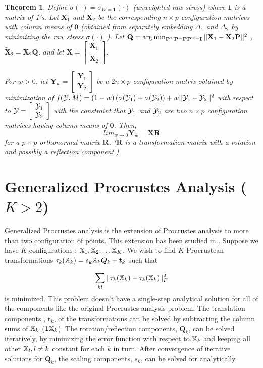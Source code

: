 \documentclass[12pt,oneside,final]{thesis}\usepackage[]{graphicx}\usepackage[]{color}
\newtheorem{thm}{Theorem}
\begin{document}
\begin{thm}
Define $\sigma(\cdot)=\sigma_{W=\bm{1}}(\cdot)$ (unweighted raw stress) where $\bm{1}$ is a matrix of 1's.
 Let $\mathbf{X}_1$ and $\mathbf{X}_2$ be the corresponding $n\times p$ configuration matrices with column means of $\bm{0}$ (obtained from separately embedding  $\Delta_1$ and $\Delta_2$ by minimizing the raw stress $\sigma(\cdot)$ ). 
Let  $\mathbf{Q}=\arg\min_{\mathbf{P^T}\mathbf{P}=\mathbf{P}\mathbf{P^T}=\mathbf{I}}||{\mathbf{X}_1-\mathbf{X}_2}\mathbf{P}||^2$ ,   $\mathbf{\tilde{X}}_2= \mathbf{X}_2\mathbf{Q}$, 
and let  
$\mathbf{X}=\left[\begin{array}{c}
\mathbf{X}_1\\
\mathbf{\tilde{X}}_2
\end{array}\right]$.

For $w>0$, let $\mathbf{Y}_{w} = \left[\begin{array}{c}
\mathbf{Y}_1\\
\mathbf{Y}_2
\end{array}\right]$  be  a $2n \times p$ configuration matrix obtained by minimization of 
$ f(\mathcal{Y}, M) =(1-w)\left({\sigma{(\mathcal{Y}_1)}}+{\sigma{(\mathcal{Y}_2)}}\right)+w||{\mathcal{Y}_1-\mathcal{Y}_2}||^2 $ with respect to  $\mathcal{Y}=\left[\begin{array}{c}
\mathcal{Y}_1\\
\mathcal{Y}_2
\end{array}\right]$ with the constraint that $\mathcal{Y}_1$ and $\mathcal{Y}_2$ are two $n \times p$ configuration matrices having column means of $\bm{0}$. Then, $$lim_{w\rightarrow0}\mathbf{Y}_{w}=\mathbf{X}\mathbf{R}$$ for a $p\times p$ orthonormal matrix $\mathbf{R}$. ($\mathbf{R}$ is a transformation matrix with a rotation and possibly a reflection component.)
\end{thm}
 
\section{Generalized Procrustes Analysis ($K>2$) \label{sec:GenProcrustes}}
Generalized Procrustes analysis is the extension of Procrustes analysis to more than two configuration of points. This extension has been studied in \cite{GPCA}. Suppose we have $K$ configurations : $\mathbb{X}_1,\mathbb{X}_2,\ldots \mathbb{X}_K$. We wish to find $K$ Procrustean transformations  $\tau_k(\mathbb{X}_k)= s_k\mathbb{X}_k\bm{Q}_k+\bm{t}_{k}$ such that 

\[\sum_{kl}\|\tau_k(\mathbb{X}_k)-\tau_k(\mathbb{X}_k)\|^2_F\] is minimized. This problem doesn't have a single-step analytical solution  for all of the components like the original Procrustes analysis problem. The translation components , $\bm{t}_{k}$, of the transformations can be solved by subtracting the column sums of $\mathbb{X}_k$ ($\mbox{{\bf 1}}\mathbb{X}_k$). The rotation/reflection components, $\bm{Q}_k$, can be solved iteratively, by minimizing the error function with respect to $\mathbb{X}_k$ and keeping all other $\mathbb{X}_l, l \neq k$ constant for each $k$ in turn. After convergence of iterative solutions for $\bm{Q}_k$, the scaling components, $s_k$, can be solved for analytically.
\end{document}

